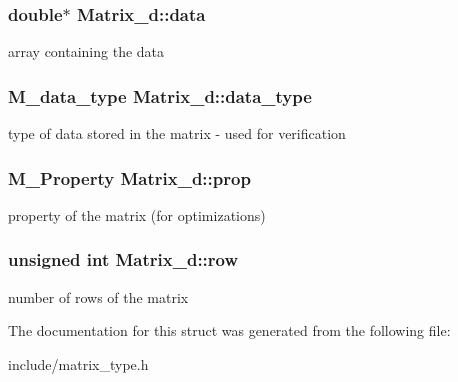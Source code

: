 \subsubsection[{\texorpdfstring{data}{data}}]{\setlength{\rightskip}{0pt plus 5cm}double$\ast$ Matrix\+\_\+d\+::data}\hypertarget{structMatrix__d_a6a9f862ced230c4b29277846ed436c90}{}\label{structMatrix__d_a6a9f862ced230c4b29277846ed436c90}
array containing the data 
\subsubsection[{\texorpdfstring{data\+\_\+type}{data_type}}]{\setlength{\rightskip}{0pt plus 5cm}M\+\_\+data\+\_\+type Matrix\+\_\+d\+::data\+\_\+type}\hypertarget{structMatrix__d_abd54be0a1d23b49811055d9c06690c5d}{}\label{structMatrix__d_abd54be0a1d23b49811055d9c06690c5d}
type of data stored in the matrix -\/ used for verification 
\subsubsection[{\texorpdfstring{prop}{prop}}]{\setlength{\rightskip}{0pt plus 5cm}M\+\_\+\+Property Matrix\+\_\+d\+::prop}\hypertarget{structMatrix__d_af7a8caafdd655171e1c6a9b1f532aa9a}{}\label{structMatrix__d_af7a8caafdd655171e1c6a9b1f532aa9a}
property of the matrix (for optimizations) 
\subsubsection[{\texorpdfstring{row}{row}}]{\setlength{\rightskip}{0pt plus 5cm}unsigned int Matrix\+\_\+d\+::row}\hypertarget{structMatrix__d_ad4e549017d2d1c5dd83e76788de8a89d}{}\label{structMatrix__d_ad4e549017d2d1c5dd83e76788de8a89d}
number of rows of the matrix 

The documentation for this struct was generated from the following file\+:\begin{DoxyCompactItemize}
\item 
include/matrix\+\_\+type.\+h\end{DoxyCompactItemize}

